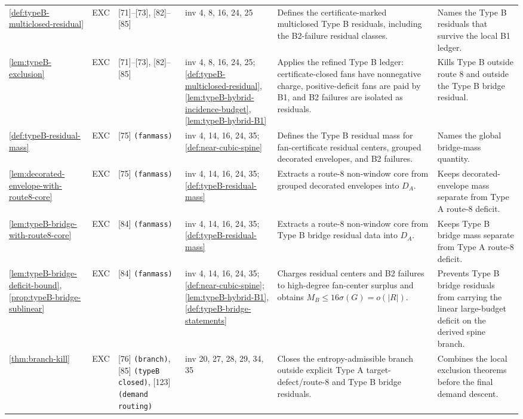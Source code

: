 \documentclass[11pt]{article}
\begin{document}
{\begin{longtable}{L{0.10\textwidth} C{0.045\textwidth} L{0.13\textwidth} L{0.135\textwidth} L{0.28\textwidth} L{0.20\textwidth}}
\cref{def:typeB-multiclosed-residual} & EXC & [71]--[73], [82]--[85] & inv 4, 8, 16, 24, 25 & Defines the certificate-marked multiclosed Type B residuals, including the B2-failure residual classes. & Names the Type B residuals that survive the local B1 ledger. \\
\cref{lem:typeB-exclusion} & EXC & [71]--[73], [82]--[85] & inv 4, 8, 16, 24, 25; \cref{def:typeB-multiclosed-residual}, \cref{lem:typeB-hybrid-incidence-budget}, \cref{lem:typeB-hybrid-B1} & Applies the refined Type B ledger: certificate-closed fans have nonnegative charge, positive-deficit fans are paid by B1, and B2 failures are isolated as residuals. & Kills Type B outside route 8 and outside the Type B bridge residual. \\
\cref{def:typeB-residual-mass} & EXC & [75] \texttt{(fanmass)} & inv 4, 14, 16, 24, 35; \cref{def:near-cubic-spine} & Defines the Type B residual mass for fan-certificate residual centers, grouped decorated envelopes, and B2 failures. & Names the global bridge-mass quantity. \\
\cref{lem:decorated-envelope-with-route8-core} & EXC & [75] \texttt{(fanmass)} & inv 4, 14, 16, 24, 35; \cref{def:typeB-residual-mass} & Extracts a route-8 non-window core from grouped decorated envelopes into \(D_A\). & Keeps decorated-envelope mass separate from Type A route-8 deficit. \\
\cref{lem:typeB-bridge-with-route8-core} & EXC & [84] \texttt{(fanmass)} & inv 4, 14, 16, 24, 35; \cref{def:typeB-residual-mass} & Extracts a route-8 non-window core from Type B bridge residual data into \(D_A\). & Keeps Type B bridge mass separate from Type A route-8 deficit. \\
\cref{lem:typeB-bridge-deficit-bound}, \cref{prop:typeB-bridge-sublinear} & EXC & [84] \texttt{(fanmass)} & inv 4, 14, 16, 24, 35; \cref{def:near-cubic-spine}; \cref{lem:typeB-hybrid-B1}, \cref{def:typeB-bridge-statements} & Charges residual centers and B2 failures to high-degree fan-center surplus and obtains \(M_B\le16\sigma(G)=o(|R|)\). & Prevents Type B bridge residuals from carrying the linear large-budget deficit on the derived spine branch. \\
\cref{thm:branch-kill} & EXC & [76] \texttt{(branch)}, [85] \texttt{(typeB closed)}, [123] \texttt{(demand routing)} & inv 20, 27, 28, 29, 34, 35 & Closes the entropy-admissible branch outside explicit Type A target-defect/route-8 and Type B bridge residuals. & Combines the local exclusion theorems before the final demand descent. \\

\end{longtable}}
\end{document}
